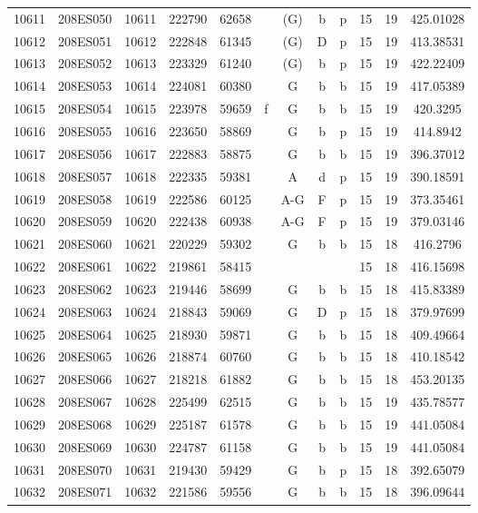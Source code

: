 \begin{tabular}{|*{12}{c|}}
10611 & 208ES050 & 10611 & 222790 & 62658 &  & (G) & b & p & 15 & 19 & 425.01028 \\ 
10612 & 208ES051 & 10612 & 222848 & 61345 &  & (G) & D & p & 15 & 19 & 413.38531 \\ 
10613 & 208ES052 & 10613 & 223329 & 61240 &  & (G) & b & p & 15 & 19 & 422.22409 \\ 
10614 & 208ES053 & 10614 & 224081 & 60380 &  & G & b & b & 15 & 19 & 417.05389 \\ 
10615 & 208ES054 & 10615 & 223978 & 59659 & f & G & b & b & 15 & 19 & 420.3295 \\ 
10616 & 208ES055 & 10616 & 223650 & 58869 &  & G & b & p & 15 & 19 & 414.8942 \\ 
10617 & 208ES056 & 10617 & 222883 & 58875 &  & G & b & b & 15 & 19 & 396.37012 \\ 
10618 & 208ES057 & 10618 & 222335 & 59381 &  & A & d & p & 15 & 19 & 390.18591 \\ 
10619 & 208ES058 & 10619 & 222586 & 60125 &  & A-G & F & p & 15 & 19 & 373.35461 \\ 
10620 & 208ES059 & 10620 & 222438 & 60938 &  & A-G & F & p & 15 & 19 & 379.03146 \\ 
10621 & 208ES060 & 10621 & 220229 & 59302 &  & G & b & b & 15 & 18 & 416.2796 \\ 
10622 & 208ES061 & 10622 & 219861 & 58415 &  &  &  &  & 15 & 18 & 416.15698 \\ 
10623 & 208ES062 & 10623 & 219446 & 58699 &  & G & b & b & 15 & 18 & 415.83389 \\ 
10624 & 208ES063 & 10624 & 218843 & 59069 &  & G & D & p & 15 & 18 & 379.97699 \\ 
10625 & 208ES064 & 10625 & 218930 & 59871 &  & G & b & b & 15 & 18 & 409.49664 \\ 
10626 & 208ES065 & 10626 & 218874 & 60760 &  & G & b & b & 15 & 18 & 410.18542 \\ 
10627 & 208ES066 & 10627 & 218218 & 61882 &  & G & b & b & 15 & 18 & 453.20135 \\ 
10628 & 208ES067 & 10628 & 225499 & 62515 &  & G & b & b & 15 & 19 & 435.78577 \\ 
10629 & 208ES068 & 10629 & 225187 & 61578 &  & G & b & b & 15 & 19 & 441.05084 \\ 
10630 & 208ES069 & 10630 & 224787 & 61158 &  & G & b & b & 15 & 19 & 441.05084 \\ 
10631 & 208ES070 & 10631 & 219430 & 59429 &  & G & b & p & 15 & 18 & 392.65079 \\ 
10632 & 208ES071 & 10632 & 221586 & 59556 &  & G & b & b & 15 & 18 & 396.09644 \\ 

\end{tabular}

